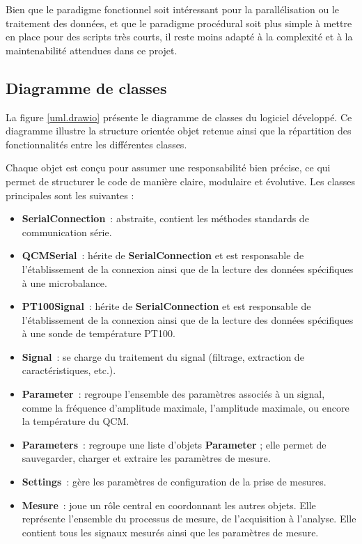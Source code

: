 Bien que le paradigme fonctionnel soit intéressant pour la parallélisation ou le traitement des données, et que le paradigme procédural soit plus simple à mettre en place pour des scripts très courts, il reste moins adapté à la complexité et à la maintenabilité attendues dans ce projet.

\subsection{Diagramme de classes}

La figure \ref{uml.drawio} présente le diagramme de classes du logiciel développé. Ce diagramme illustre la structure orientée objet retenue ainsi que la répartition des fonctionnalités entre les différentes classes.

Chaque objet est conçu pour assumer une responsabilité bien précise, ce qui permet de structurer le code de manière claire, modulaire et évolutive. Les classes principales sont les suivantes :

\begin{itemize}[label=\textbullet]
  \item \textbf{SerialConnection}~: abstraite, contient les méthodes standards de communication série.
  \item \textbf{QCMSerial}~: hérite de \textbf{SerialConnection} et est responsable de l’établissement de la connexion ainsi que de la lecture des données spécifiques à une microbalance.
  \item \textbf{PT100Signal}~: hérite de \textbf{SerialConnection} et est responsable de l’établissement de la connexion ainsi que de la lecture des données spécifiques à une sonde de température PT100.
  \item \textbf{Signal}~: se charge du traitement du signal (filtrage, extraction de caractéristiques, etc.).
  \item \textbf{Parameter}~: regroupe l’ensemble des paramètres associés à un signal, comme la fréquence d’amplitude maximale, l'amplitude maximale, ou encore la température du QCM.
  \item \textbf{Parameters}~: regroupe une liste d’objets \textbf{Parameter} ; elle permet de sauvegarder, charger et extraire les paramètres de mesure.
  \item \textbf{Settings}~: gère les paramètres de configuration de la prise de mesures.
  \item \textbf{Mesure}~: joue un rôle central en coordonnant les autres objets. Elle représente l’ensemble du processus de mesure, de l’acquisition à l’analyse. Elle contient tous les signaux mesurés ainsi que les paramètres de mesure.
\end{itemize}

